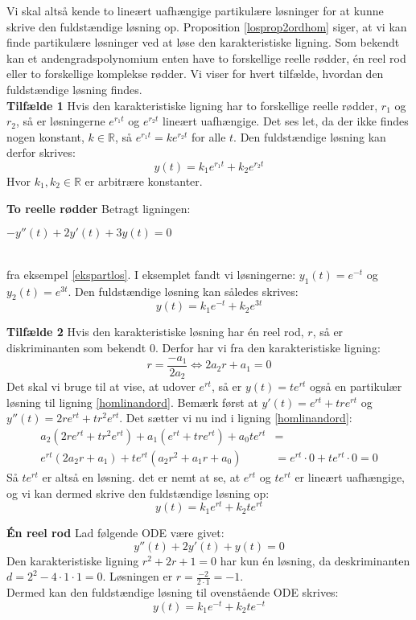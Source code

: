 \hfill \break
Vi skal altså kende to lineært uafhængige partikulære løsninger for at kunne skrive den fuldstændige løsning op. Proposition \ref{losprop2ordhom} siger, at vi kan finde partikulære løsninger ved at løse den karakteristiske ligning. Som bekendt kan et andengradspolynomium enten have to forskellige reelle rødder, én reel rod eller to forskellige komplekse rødder. Vi viser for hvert tilfælde, hvordan den fuldstændige løsning findes. \\ \hfill \break
\textbf{Tilfælde 1}\hfill \break
Hvis den karakteristiske ligning har to forskellige reelle rødder, $r_1$ og $r_2$, så er løsningerne $e^{r_1t}$ og $e^{r_2t}$ lineært uafhængige. Det ses let, da der ikke findes nogen konstant, $k\in \mathbb{R}$, så $e^{r_1t}=ke^{r_2t}$ for alle $t$. Den fuldstændige løsning kan derfor skrives: \hfill \break
$$y(t)=k_1e^{r_1t}+k_2e^{r_2t}$$\hfill \break
Hvor $k_1,k_2\in \mathbb{R}$ er arbitrære konstanter.\\ \hfill \break
\begin{Example}\textbf{To reelle rødder}\hfill \break
\textnormal{Betragt ligningen:} \hfill \break
\centerline{$-y''(t)+2y'(t)+3y(t)=0$}\\ \hfill \break
\textnormal{fra eksempel \ref{ekspartlos}. I eksemplet fandt vi løsningerne: $y_1(t)=e^{-t}$ og $y_2(t)=e^{3t}$. Den fuldstændige løsning kan således skrives:}\hfill \break
$$y(t)=k_1e^{-t}+k_2e^{3t}$$
\end{Example}
\hfill \break
\textbf{Tilfælde 2}\hfill \break
Hvis den karakteristiske løsning har én reel rod, $r$, så er diskriminanten som bekendt 0. Derfor har vi fra den karakteristiske ligning: \hfill \break
$$r=\frac{-a_1}{2a_2}\Leftrightarrow 2a_2r+a_1=0$$
\hfill \break
Det skal vi bruge til at vise, at udover $e^{rt}$, så er $y(t)=te^{rt}$ også en partikulær løsning til ligning \eqref{homlinandord}. Bemærk først at $y'(t)=e^{rt}+tre^{rt}$ og $y''(t)=2re^{rt}+tr^2e^{rt}$. Det sætter vi nu ind i ligning \eqref{homlinandord}: 
\hfill \break
\begin{align*}
a_2(2re^{rt}+tr^2e^{rt})+a_1(e^{rt}+tre^{rt})+a_0te^{rt}&=\\
e^{rt}(2a_2r+a_1)+te^{rt}(a_2r^2+a_1r+a_0)&=e^{rt}\cdot 0+te^{rt}\cdot 0=0
\end{align*}
\hfill \break
Så $te^{rt}$ er altså en løsning. det er nemt at se, at $e^{rt}$ og $te^{rt}$ er lineært uafhængige, og vi kan dermed skrive den fuldstændige løsning op:\hfill \break
$$y(t)=k_1e^{rt}+k_2te^{rt}$$ \hfill \break
\begin{Example}\textbf{Én reel rod}\hfill \break
\textnormal{Lad følgende ODE være givet:}\hfill \break
$$y''(t)+2y'(t)+y(t)=0$$\hfill \break
\textnormal{Den karakteristiske ligning $r^2+2r+1=0$ har kun én løsning, da deskriminanten $d=2^2-4\cdot 1\cdot 1=0$. Løsningen er $r=\frac{-2}{2\cdot 1}=-1$.}\\ \hfill \break
\textnormal{Dermed kan den fuldstændige løsning til ovenstående ODE skrives:}\hfill \break
$$y(t)=k_1e^{-t}+k_2te^{-t}$$
\end{Example}
